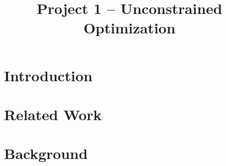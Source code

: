 \documentclass[conference]{IEEEtran}
\begin{document}
\title{\LARGE \textbf{Project 1 -- Unconstrained Optimization} 
}


\author{
} %


\maketitle

\begin{abstract}
\end{abstract}


\section{Introduction}
\label{sec:introduction}








\section{Related Work}
\label{sec:related-work}


\section{Background}
\label{sec:background}
\end{document}
